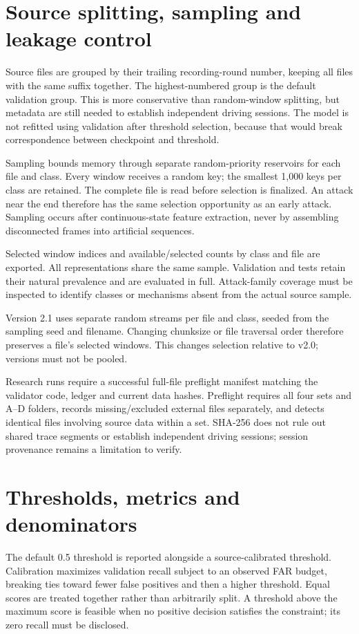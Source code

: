 \documentclass[12pt,a4paper,oneside,openany]{extbook}
\begin{document}
\section{Source splitting, sampling and leakage control}
Source files are grouped by their trailing recording-round number, keeping all files with the same suffix together. The highest-numbered group is the default validation group. This is more conservative than random-window splitting, but metadata are still needed to establish independent driving sessions. The model is not refitted using validation after threshold selection, because that would break correspondence between checkpoint and threshold.

Sampling bounds memory through separate random-priority reservoirs for each file and class. Every window receives a random key; the smallest 1,000 keys per class are retained. The complete file is read before selection is finalized. An attack near the end therefore has the same selection opportunity as an early attack. Sampling occurs after continuous-state feature extraction, never by assembling disconnected frames into artificial sequences.

Selected window indices and available/selected counts by class and file are exported. All representations share the same sample. Validation and tests retain their natural prevalence and are evaluated in full. Attack-family coverage must be inspected to identify classes or mechanisms absent from the actual source sample.

Version 2.1 uses separate random streams per file and class, seeded from the sampling seed and filename. Changing chunksize or file traversal order therefore preserves a file's selected windows. This changes selection relative to v2.0; versions must not be pooled.

Research runs require a successful full-file preflight manifest matching the validator code, ledger and current data hashes. Preflight requires all four sets and A--D folders, records missing/excluded external files separately, and detects identical files involving source data within a set. SHA-256 does not rule out shared trace segments or establish independent driving sessions; session provenance remains a limitation to verify.

\section{Thresholds, metrics and denominators}
The default 0.5 threshold is reported alongside a source-calibrated threshold. Calibration maximizes validation recall subject to an observed FAR budget, breaking ties toward fewer false positives and then a higher threshold. Equal scores are treated together rather than arbitrarily split. A threshold above the maximum score is feasible when no positive decision satisfies the constraint; its zero recall must be disclosed.
\end{document}

